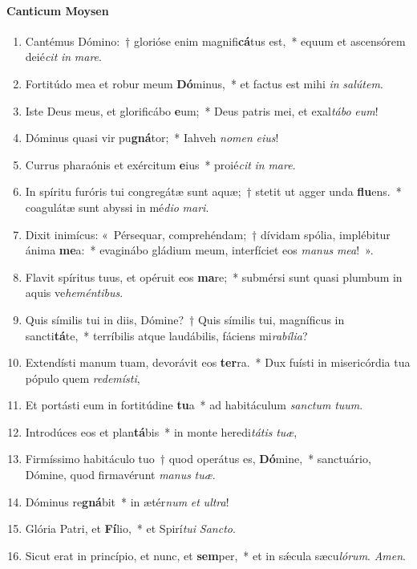 \documentclass[twoside]{article}
\begin{document}
\begin{paracol}[1]{2}
\paragraph{Canticum Moysen}



\begin{enumerate}[wide, itemsep=0mm, labelwidth=!, labelindent=0pt, label=\color{gregoriocolor}\theenumi]
\item Cantémus Dómino:~† glorióse enim magnifi\textbf{cá}tus est,~* equum et ascensórem deié\textit{cit} \textit{in} \textit{ma}\textit{re}.
\item Fortitúdo mea et robur meum \textbf{Dó}minus,~* et factus est mihi \textit{in} \textit{sa}\textit{lú}\textit{tem}.
\item Iste Deus meus, et glorificábo \textbf{e}um;~* Deus patris mei, et exal\textit{tá}\textit{bo} \textit{e}\textit{um}!
\item Dóminus quasi vir pu\textbf{gná}tor;~* Iahveh \textit{no}\textit{men} \textit{e}\textit{ius}!
\item Currus pharaónis et exércitum \textbf{e}ius~* proié\textit{cit} \textit{in} \textit{ma}\textit{re}.
\item In spíritu furóris tui congregátæ sunt aquæ;~† stetit ut agger unda \textbf{flu}ens.~* coagulátæ sunt abyssi in mé\textit{di}\textit{o} \textit{ma}\textit{ri}.
\item Dixit inimícus: «~Pérsequar, comprehéndam;~† dívidam spólia, implébitur ánima \textbf{me}a:~* evaginábo gládium meum, interfíciet eos \textit{ma}\textit{nus} \textit{me}\textit{a}!~».
\item Flavit spíritus tuus, et opéruit eos \textbf{ma}re;~* submérsi sunt quasi plumbum in aquis ve\textit{he}\textit{mén}\textit{ti}\textit{bus}.
\item Quis símilis tui in diis, Dómine?~† Quis símilis tui, magníficus in sancti\textbf{tá}te,~* terríbilis atque laudábilis, fáciens mi\textit{ra}\textit{bí}\textit{li}\textit{a}?
\item Extendísti manum tuam, devorávit eos \textbf{ter}ra.~* Dux fuísti in misericórdia tua pópulo quem \textit{red}\textit{e}\textit{mís}\textit{ti},
\item Et portásti eum in fortitúdine \textbf{tu}a~* ad habitáculum \textit{sanc}\textit{tum} \textit{tu}\textit{um}.
\item Introdúces eos et plan\textbf{tá}bis~* in monte heredi\textit{tá}\textit{tis} \textit{tu}\textit{æ},
\item Firmíssimo habitáculo tuo~† quod operátus es, \textbf{Dó}mine,~* sanctuário, Dómine, quod firmavérunt \textit{ma}\textit{nus} \textit{tu}\textit{æ}.
\item Dóminus re\textbf{gná}bit~* in ætér\textit{num} \textit{et} \textit{ul}\textit{tra}!
\item Glória Patri, et \textbf{Fí}lio,~* et Spirí\textit{tu}\textit{i} \textit{Sanc}\textit{to}.
\item Sicut erat in princípio, et nunc, et \textbf{sem}per,~* et in sǽcula sæcu\textit{ló}\textit{rum}. \textit{A}\textit{men}.
\end{enumerate}


\end{paracol}
\end{document}
